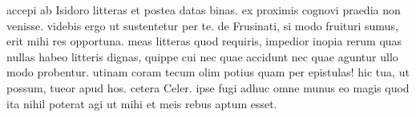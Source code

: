 


accepi ab Isidoro litteras et postea datas binas. ex proximis cognovi praedia non venisse. videbis ergo ut sustentetur per te. de Frusinati, si modo fruituri sumus, erit mihi res opportuna. meas litteras quod requiris, impedior inopia rerum quas nullas habeo
            litteris dignas, quippe cui nec quae accidunt nec quae aguntur ullo modo probentur.
            utinam coram tecum olim potius quam per epistulas! hic tua, ut possum, tueor
            apud hos. cetera Celer. ipse fugi adhuc omne munus eo magis quod ita nihil
            poterat agi ut mihi et meis rebus aptum esset.
